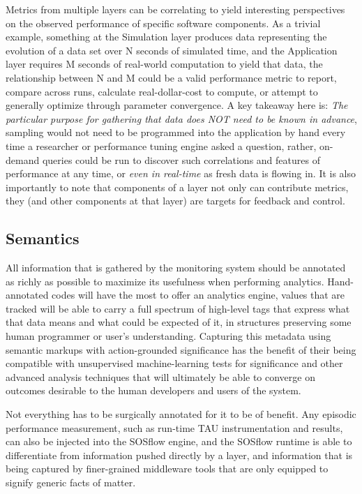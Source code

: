 Metrics from multiple layers can be correlating to yield interesting
perspectives on the observed performance of specific software
components.
%
As a trivial example, something at the Simulation layer produces data
representing the evolution of a data set over N seconds of simulated
time, and the Application layer requires M seconds of real-world
computation to yield that data, the relationship between N and M could
be a valid performance metric to report, compare across runs,
calculate real-dollar-cost to compute, or attempt to generally
optimize through parameter convergence.
%
A key takeaway here is: \textit{The particular purpose for gathering
  that data does NOT need to be known in advance}, sampling would not
need to be programmed into the application by hand every time a
researcher or performance tuning engine asked a question, rather,
on-demand queries could be run to discover such correlations and
features of performance at any time, or \textit{even in real-time} as
fresh data is flowing in.
%
It is also importantly to note that components of a layer not only can
contribute metrics, they (and other components at that layer) are
targets for feedback and control.


\subsection{Semantics}

All information that is gathered by the monitoring system should be
annotated as richly as possible to maximize its usefulness when
performing analytics.
%
Hand-annotated codes will have the most to offer an analytics engine,
values that are tracked will be able to carry a full spectrum of
high-level tags that express what that data means and what could be
expected of it, in structures preserving some human programmer or
user's understanding.
%
Capturing this metadata using semantic markups with action-grounded
significance has the benefit of their being compatible with
unsupervised machine-learning tests for significance and other
advanced analysis techniques that will ultimately be able to converge
on outcomes desirable to the human developers and users of the system.

Not everything has to be surgically annotated for it to be of benefit.
%
Any episodic performance measurement, such as run-time TAU
instrumentation and results, can also be injected into the SOSflow engine, and the
SOSflow runtime is able to differentiate from information pushed
directly by a layer, and information that is being captured by finer-grained
middleware tools that are only equipped to signify generic facts of matter.


